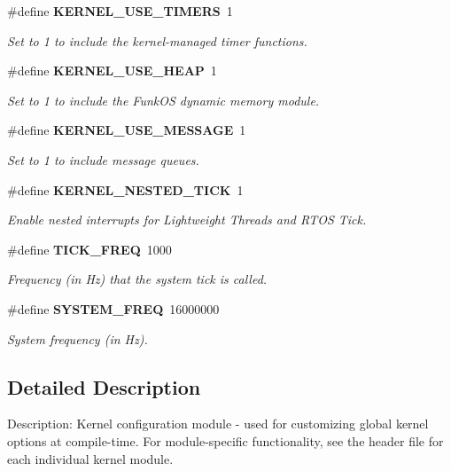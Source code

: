 \begin{DoxyCompactItemize}
\#define {\bf KERNEL\_\-USE\_\-TIMERS}~1
\begin{DoxyCompactList}\small\item\em Set to 1 to include the kernel-\/managed timer functions. \item\end{DoxyCompactList}\item 
\#define {\bf KERNEL\_\-USE\_\-HEAP}~1
\begin{DoxyCompactList}\small\item\em Set to 1 to include the FunkOS dynamic memory module. \item\end{DoxyCompactList}\item 
\#define {\bf KERNEL\_\-USE\_\-MESSAGE}~1
\begin{DoxyCompactList}\small\item\em Set to 1 to include message queues. \item\end{DoxyCompactList}\item 
\#define {\bf KERNEL\_\-NESTED\_\-TICK}~1
\begin{DoxyCompactList}\small\item\em Enable nested interrupts for Lightweight Threads and RTOS Tick. \item\end{DoxyCompactList}\item 
\#define {\bf TICK\_\-FREQ}~1000
\begin{DoxyCompactList}\small\item\em Frequency (in Hz) that the system tick is called. \item\end{DoxyCompactList}\item 
\#define {\bf SYSTEM\_\-FREQ}~16000000
\begin{DoxyCompactList}\small\item\em System frequency (in Hz). \item\end{DoxyCompactList}\end{DoxyCompactItemize}


\subsection{Detailed Description}
Description: Kernel configuration module -\/ used for customizing global kernel options at compile-\/time. For module-\/specific functionality, see the header file for each individual kernel module. 

